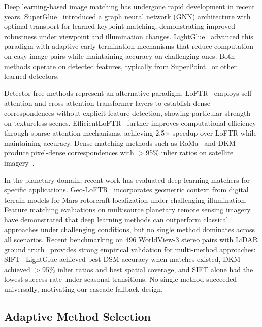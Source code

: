\documentclass[lettersize,journal]{IEEEtran}
\begin{document}
Deep learning-based image matching has undergone rapid development in recent years. SuperGlue~\cite{sarlin2020superglue} introduced a graph neural network (GNN) architecture with optimal transport for learned keypoint matching, demonstrating improved robustness under viewpoint and illumination changes. LightGlue~\cite{lindenberger2023lightglue} advanced this paradigm with adaptive early-termination mechanisms that reduce computation on easy image pairs while maintaining accuracy on challenging ones. Both methods operate on detected features, typically from SuperPoint~\cite{detone2018superpoint} or other learned detectors.

Detector-free methods represent an alternative paradigm. LoFTR~\cite{sun2021loftr} employs self-attention and cross-attention transformer layers to establish dense correspondences without explicit feature detection, showing particular strength on textureless scenes. EfficientLoFTR~\cite{wang2024efficientloftr} further improves computational efficiency through sparse attention mechanisms, achieving 2.5$\times$ speedup over LoFTR while maintaining accuracy. Dense matching methods such as RoMa~\cite{edstedt2024roma} and DKM~\cite{edstedt2023dkm} produce pixel-dense correspondences with $>$95\% inlier ratios on satellite imagery~\cite{satellite2024benchmark}.

In the planetary domain, recent work has evaluated deep learning matchers for specific applications. Geo-LoFTR~\cite{geoloftr2025} incorporates geometric context from digital terrain models for Mars rotorcraft localization under challenging illumination. Feature matching evaluations on multisource planetary remote sensing imagery~\cite{ye2024planetary} have demonstrated that deep learning methods can outperform classical approaches under challenging conditions, but no single method dominates across all scenarios. Recent benchmarking on 496 WorldView-3 stereo pairs with LiDAR ground truth~\cite{satellite2024benchmark} provides strong empirical validation for multi-method approaches: SIFT+LightGlue achieved best DSM accuracy when matches existed, DKM achieved $>$95\% inlier ratios and best spatial coverage, and SIFT alone had the lowest success rate under seasonal transitions. No single method succeeded universally, motivating our cascade fallback design.

\subsection{Adaptive Method Selection}
\end{document}
